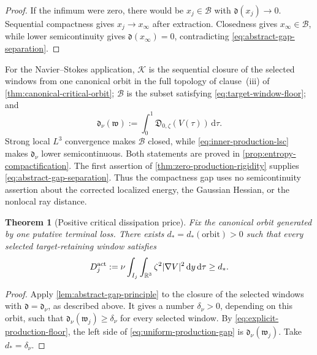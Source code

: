 \documentclass[11pt]{amsart}
\numberwithin{equation}{section}
\theoremstyle{plain}
\newtheorem{theorem}{Theorem}[section]
\theoremstyle{definition}
\theoremstyle{remark}
\newcommand{\R}{\mathbb R}
\newcommand{\dd}{\,\mathrm d}
\begin{document}
\begin{proof}
If the infimum were zero, there would be \(x_j\in\mathcal B\) with
\(\mathfrak d(x_j)\to0\).  Sequential compactness gives
\(x_j\to x_\infty\) after extraction.  Closedness gives
\(x_\infty\in\mathcal B\), while lower semicontinuity gives
\(\mathfrak d(x_\infty)=0\), contradicting
\eqref{eq:abstract-gap-separation}.
\end{proof}

For the Navier--Stokes application, \(\mathcal K\) is the sequential closure
of the selected windows from one canonical orbit in the full topology of
clause~\textup{(iii)} of \cref{thm:canonical-critical-orbit};
\(\mathcal B\) is the subset satisfying
\eqref{eq:target-window-floor}; and
\begin{equation}\label{eq:dirichlet-gap-functional}
 \mathfrak d_\nu(\mathfrak w)
 :=\int_0^1\mathfrak D_{0,\zeta}(V(\tau))\dd\tau.
\end{equation}
Strong local \(L^3\) convergence makes \(\mathcal B\) closed, while
\eqref{eq:inner-production-lsc} makes \(\mathfrak d_\nu\) lower
semicontinuous.  Both statements are proved in
\cref{prop:entropy-compactification}.  The first assertion of
\cref{thm:zero-production-rigidity} supplies
\eqref{eq:abstract-gap-separation}.  Thus the compactness gap uses no
semicontinuity assertion about the corrected localized energy, the Gaussian Hessian,
or the nonlocal ray distance.

\begin{theorem}[Positive critical dissipation price]
\label{thm:uniform-production-gap}
Fix the canonical orbit generated by one putative terminal loss.  There
exists \(d_*=d_*(\text{orbit})>0\) such that every selected
target-retaining window satisfies
\begin{equation}\label{eq:uniform-production-gap}
 D_j^{\rm act}:=\nu\int_{I_j}\int_{\R^3}\zeta^2|\nabla V|^2
 \dd y\dd\tau\ge d_*.
\end{equation}
\end{theorem}

\begin{proof}
Apply \cref{lem:abstract-gap-principle} to the closure of the selected
windows with \(\mathfrak d=\mathfrak d_\nu\), as described above.  It gives
a number \(\delta_\nu>0\), depending on this orbit, such that
\(\mathfrak d_\nu(\mathfrak w_j)\ge\delta_\nu\) for every selected window.
By \eqref{eq:explicit-production-floor}, the left side of
\eqref{eq:uniform-production-gap} is
\(\mathfrak d_\nu(\mathfrak w_j)\).  Take \(d_*=\delta_\nu\).
\end{proof}
\end{document}

